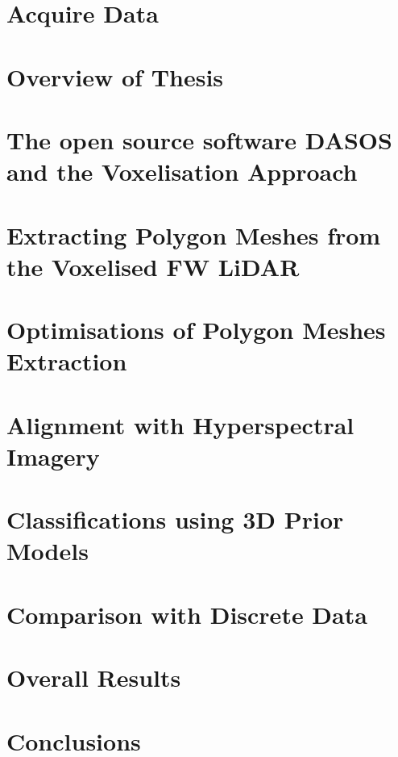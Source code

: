 \documentclass[11pt,nofootinbib]{report}
\begin{document}
    \chapter{Acquire Data}\label{AcquireData}
	    
	    \newpage
	\chapter{Overview of Thesis}\label{PipeLine}
		

	\chapter{The open source software DASOS and the Voxelisation Approach}\label{DASOS_Voxelisation}
	  		
	\newpage


		 		
	\chapter{Extracting Polygon Meshes from the Voxelised FW LiDAR}\label{Visualisations}
		
		\newpage
    \chapter{Optimisations of Polygon Meshes Extraction}\label{Optimisations}
			 
			 \newpage
	\chapter{Alignment with Hyperspectral Imagery}\label{Alignment}
		
		\newpage		
	\chapter{Classifications using 3D Prior Models}\label{Classifications}
		
		\newpage
	\chapter{Comparison with Discrete Data}\label{ComparisonDiscreteVsFW}
	    
	    \newpage
	\chapter{Overall Results}\label{Results}
		
		\newpage
	\chapter{Conclusions}\label{Conclusions}
		
		\newpage
\end{document}
